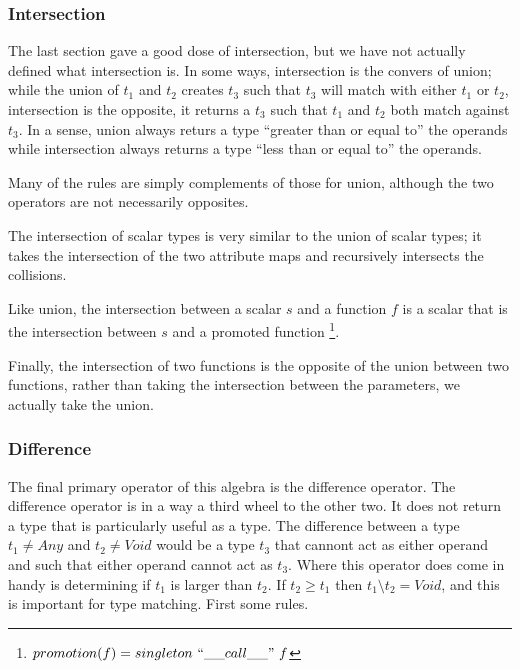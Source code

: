 \documentclass{scrartcl}
\begin{document}
\begin{multicols}{2}
\subsubsection*{Intersection}

The last section gave a good dose of intersection, but we have not actually
defined what intersection is. In some ways, intersection is the convers of
union; while the union of $t_1$ and $t_2$ creates $t_3$ such that $t_3$ will
match with either $t_1$ or $t_2$, intersection is the opposite, it returns
a $t_3$ such that $t_1$ and $t_2$ both match against $t_3$. In a sense, union
always returs a type ``greater than or equal to'' the operands while
intersection always returns a type ``less than or equal to'' the operands.

Many of the rules are simply complements of those for union, although the two
operators are not necessarily opposites.





The intersection of scalar types is very similar to the union of scalar types;
it takes the intersection of the two attribute maps and recursively
intersects the collisions.


Like union, the intersection between a scalar $s$ and a function $f$
is a scalar that is the intersection between $s$ and a promoted function%
\footnote{$promotion(f) = singleton\ ``\_\_call\_\_"\ f$}.


Finally, the intersection of two functions is the opposite of the union
between two functions, rather than taking the intersection between the
parameters, we actually take the union.


\subsubsection*{Difference}

The final primary operator of this algebra is the difference operator.
The difference operator is in a way a third wheel to the other two. It
does not return a type that is particularly useful as a type. The difference
between a type $t_1\not = Any$ and $t_2\not = Void$ would be a type $t_3$ that cannont act
as either operand and such that either operand cannot act as $t_3$. Where
this operator does come in handy is determining if $t_1$ is larger than $t_2$.
If $t_2\geq t_1$ then $t_1\setminus t_2 = Void$, and this is important for
type matching. First some rules.


\end{multicols}
\end{document}
